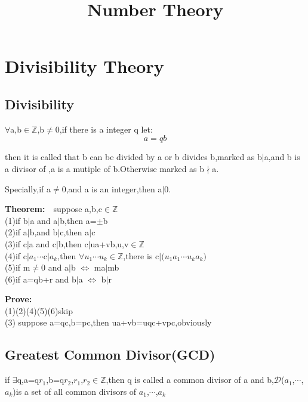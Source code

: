 \documentclass{ctexart}
\date{}
\title{Number Theory}
\begin{document}
	\maketitle
\tableofcontents
\newpage

\section{Divisibility Theory}
	\subsection{Divisibility}
		\(\forall\)a,b\(\in\mathbb{Z}\),b\(\neq\)0,if there is a integer q let:
		\[a=qb\]

 then it is called that b can be divided by a or b divides b,marked as b\(\mid\)a,and b is a divisor of ,a is    a mutiple of b.Otherwise marked as b\(\nmid\)a.

Specially,if a\(\neq\)0,and a is an integer,then a\(\mid\)0.

\vspace{12 pt}
\textbf{Theorem:}\(\quad\)suppose a,b,c\(\in\)\(\mathbb{Z}\)
\\(1)if b\(\mid\)a and a\(\mid\)b,then a=\(\pm\)b
\\(2)if a\(\mid\)b,and b\(\mid\)c,then a\(\mid\)c
\\(3)if c\(\mid\)a and c\(\mid\)b,then c\(\mid\)ua+vb,u,v\(\in\)\(\mathbb{Z}\)
\\(4)if c\(\mid\)\(a_{1}\)\(\cdots\)c\(\mid\)\(a_{k}\),then \(\forall\)\(u_{1}\)\(\cdots\)\(u_{k}\)\(\in\)\(\mathbb{Z}\),there is c\(\mid\)\((u_{1}a_{1}\)\(\cdots\)\(u_{k}a_{k})\)
\\(5)if m\(\neq\)0 and a\(\mid\)b \(\Leftrightarrow\) ma\(\mid\)mb
\\(6)if a=qb+r and b\(\mid\)a \(\Leftrightarrow\) b\(\mid\)r

\vspace{12 pt}
\textbf{Prove:}
\\(1)(2)(4)(5)(6)skip
\\(3) suppose a=qc,b=pc,then ua+vb=uqc+vpc,obviously

 \vspace{12 pt}
	\subsection{Greatest Common Divisor(GCD)}

if \(\exists\)q,a=q\(r_{1}\),b=q\(r_{2}\),\(r_{1}\),\(r_{2}\)\(\in\)\(\mathbb{Z}\),then q is called a common divisor of a and b,\(\mathcal{D}\)(\(a_1\),\(\cdots\),\(a_k\))is a set of all common divisors of \(a_1\),\(\cdots\),\(a_k\)
\end{document}
